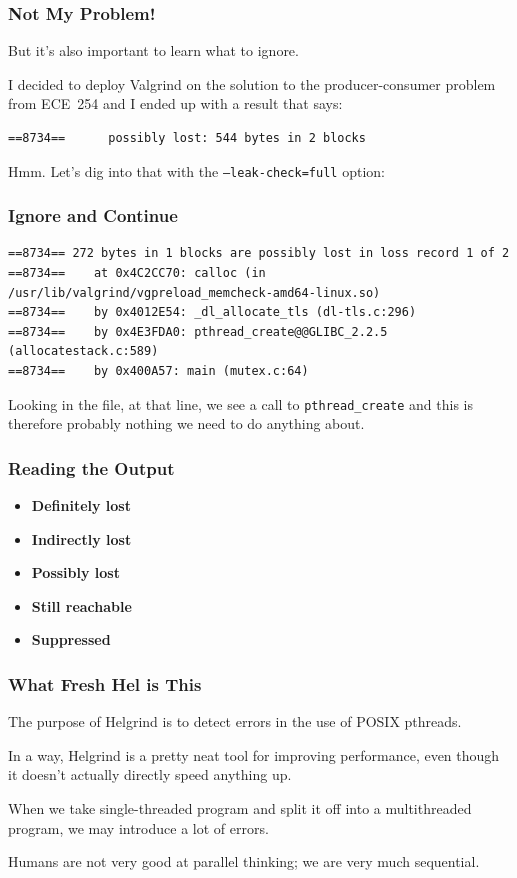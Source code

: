\begin{frame}[fragile]
\frametitle{Not My Problem!}

But it's also important to learn what to ignore. 

I decided to deploy Valgrind on the solution to the producer-consumer problem from ECE~254 and I ended up with a result that says:

\begin{verbatim}
==8734==      possibly lost: 544 bytes in 2 blocks
\end{verbatim}

Hmm. Let's dig into that with the \texttt{--leak-check=full} option:

\end{frame}

\begin{frame}[fragile]
\frametitle{Ignore and Continue}
{\scriptsize
\begin{verbatim}
==8734== 272 bytes in 1 blocks are possibly lost in loss record 1 of 2
==8734==    at 0x4C2CC70: calloc (in /usr/lib/valgrind/vgpreload_memcheck-amd64-linux.so)
==8734==    by 0x4012E54: _dl_allocate_tls (dl-tls.c:296)
==8734==    by 0x4E3FDA0: pthread_create@@GLIBC_2.2.5 (allocatestack.c:589)
==8734==    by 0x400A57: main (mutex.c:64)
\end{verbatim}
}

Looking in the file, at that line, we see a call to \texttt{pthread\_create} and this is therefore probably nothing we need to do anything about. 


\end{frame}

\begin{frame}
\frametitle{Reading the Output}

\begin{itemize}
	\item \textbf{Definitely lost}
	\item \textbf{Indirectly lost}
	\item \textbf{Possibly lost}
	\item \textbf{Still reachable}
	\item \textbf{Suppressed}
\end{itemize}



\end{frame}

\begin{frame}
\frametitle{What Fresh Hel is This}

The purpose of Helgrind is to detect errors in the use of POSIX pthreads. 

In a way, Helgrind is a pretty neat tool for improving performance, even though it doesn't actually directly speed anything up. 

When we take single-threaded program and split it off into a multithreaded program, we may introduce a lot of errors.

Humans are not very good at parallel thinking; we are very much sequential.

\end{frame}

